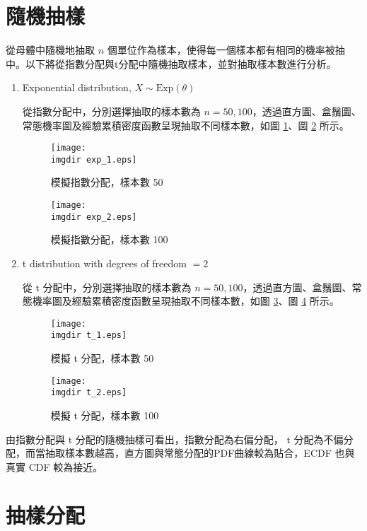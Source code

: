 \section{隨機抽樣}
從母體中隨機地抽取 $n$ 個單位作為樣本，使得每一個樣本都有相同的機率被抽中。以下將從指數分配與t分配中隨機抽取樣本，並對抽取樣本數進行分析。
\begin{enumerate}
\item
Exponential distribution, $X \sim \text{Exp}(\theta)$

從指數分配中，分別選擇抽取的樣本數為 $n = 50, 100$，透過直方圖、盒鬚圖、常態機率圖及經驗累積密度函數呈現抽取不同樣本數，如圖 \ref{fig:exp_1}、圖 \ref{fig:exp_2} 所示。

\begin{figure}[H]
    \centering
        \texttt{[image: \\imgdir exp\_1.eps]}
    \caption{模擬指數分配，樣本數 50}
    \label{fig:exp_1}
\end{figure}

\begin{figure}[H]
    \centering
        \texttt{[image: \\imgdir exp\_2.eps]}
    \caption{模擬指數分配，樣本數 100}
    \label{fig:exp_2}
\end{figure}

\item
t distribution with degrees of freedom $= 2$
\vspace{0.2cm}

從 t 分配中，分別選擇抽取的樣本數為 $n = 50, 100$，透過直方圖、盒鬚圖、常態機率圖及經驗累積密度函數呈現抽取不同樣本數，如圖 \ref{fig:t_1}、圖 \ref{fig:t_2} 所示。

\begin{figure}[H]
    \centering
        \texttt{[image: \\imgdir t\_1.eps]}
    \caption{模擬 t 分配，樣本數 50}
    \label{fig:t_1}
\end{figure}

\begin{figure}[H]
    \centering
        \texttt{[image: \\imgdir t\_2.eps]}
    \caption{模擬 t 分配，樣本數 100}
    \label{fig:t_2}
\end{figure}
\end{enumerate}
由指數分配與 t 分配的隨機抽樣可看出，指數分配為右偏分配， t 分配為不偏分配，而當抽取樣本數越高，直方圖與常態分配的PDF曲線較為貼合，ECDF 也與真實 CDF 較為接近。

\section{抽樣分配}


